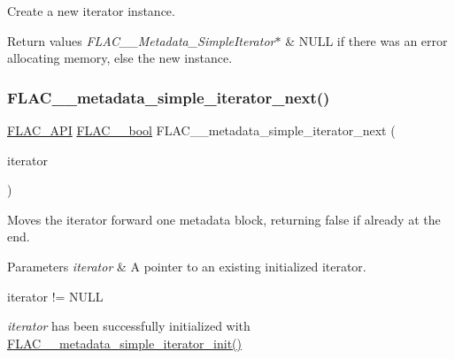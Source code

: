 Create a new iterator instance.


\begin{DoxyRetVals}{Return values}
{\em F\+L\+A\+C\+\_\+\+\_\+\+Metadata\+\_\+\+Simple\+Iterator$\ast$} & {\ttfamily N\+U\+LL} if there was an error allocating memory, else the new instance. \\
\hline
\end{DoxyRetVals}
\mbox{\label{group__flac__metadata__level1_gacac860d14fc0ff37cc2c034d3f972320}} 
\subsubsection{\texorpdfstring{F\+L\+A\+C\+\_\+\+\_\+metadata\+\_\+simple\+\_\+iterator\+\_\+next()}{FLAC\_\_metadata\_simple\_iterator\_next()}}
{\footnotesize\ttfamily \hyperlink{group__flac__export_ga56ca07df8a23310707732b1c0007d6f5}{F\+L\+A\+C\+\_\+\+A\+PI} \hyperlink{ordinals_8h_a95103469f1cbd78b8cf250194985b34e}{F\+L\+A\+C\+\_\+\+\_\+bool} F\+L\+A\+C\+\_\+\+\_\+metadata\+\_\+simple\+\_\+iterator\+\_\+next (\begin{DoxyParamCaption}\item[{\hyperlink{group__flac__metadata__level1_ga6accccddbb867dfc2eece9ee3ffecb3a}{F\+L\+A\+C\+\_\+\+\_\+\+Metadata\+\_\+\+Simple\+Iterator} $\ast$}]{iterator }\end{DoxyParamCaption})}

Moves the iterator forward one metadata block, returning {\ttfamily false} if already at the end.


\begin{DoxyParams}{Parameters}
{\em iterator} & A pointer to an existing initialized iterator.  
\begin{DoxyCode}
iterator != NULL 
\end{DoxyCode}
 {\itshape iterator} has been successfully initialized with \hyperlink{group__flac__metadata__level1_ga2a055cca4e6e06ae62517c8b0fa6e8a3}{F\+L\+A\+C\+\_\+\+\_\+metadata\+\_\+simple\+\_\+iterator\+\_\+init()} \\
\hline
\end{DoxyParams}

